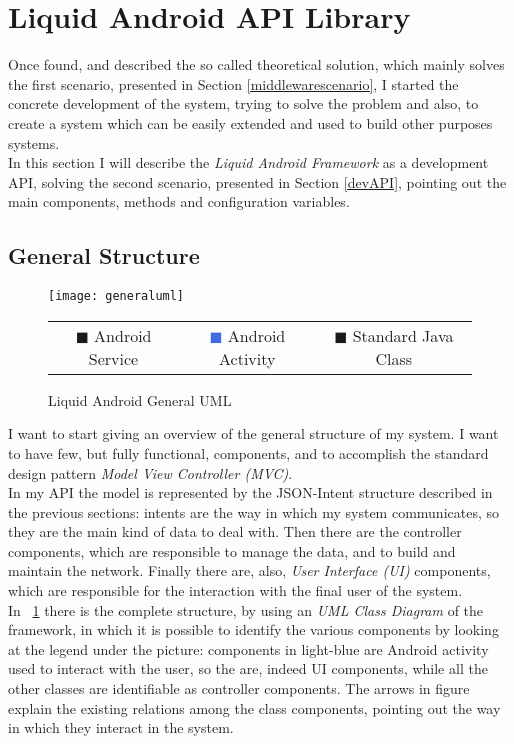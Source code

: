 \section{Liquid Android API Library}\label{API}
Once found, and described the so called theoretical solution, which mainly solves the first scenario, presented in Section \ref{middlewarescenario}, I started the concrete development of the system, trying to solve the problem and also, to create a system which can be easily extended and used to build other purposes systems.\\
In this section I will describe the \textit{Liquid Android Framework} as a development API, solving the second scenario, presented in Section \ref{devAPI}, pointing out the main components, methods and configuration variables.
\subsection{General Structure}
\begin{figure}[h!]
	\centering
	\texttt{[image: generaluml]}
	\caption{Liquid Android General UML}
	\label{fig:4.7}
	\begin{tabular}{ccc}
		\textcolor{OliveGreen}{$\blacksquare$} Android Service & \textcolor{RoyalBlue}{$\blacksquare$} Android Activity & \textcolor{RoyalPurple}{$\blacksquare$} Standard Java Class\\
	\end{tabular}
\end{figure}
I want to start giving an overview of the general structure of my system. I want to have few, but fully functional, components, and to accomplish the standard design pattern \textit{Model View Controller (MVC)}.\\
In my API the model is represented by the JSON-Intent structure described in the previous sections: intents are the way in which my system communicates, so they are the main kind of data to deal with. Then there are the controller components, which are responsible to manage the data, and to build and maintain the network. Finally there are, also, \textit{User Interface (UI)} components, which are responsible for the interaction with the final user of the system.\\
In \figurename~\ref{fig:4.7} there is the complete structure, by using an \textit{UML Class Diagram} of the framework, in which it is possible to identify the various components by looking at the legend under the picture: components in light-blue are Android activity used to interact with the user, so the are, indeed UI components, while all the other classes are identifiable as controller components. The arrows in figure explain the existing relations among the class components, pointing out the way in which they interact in the system.
